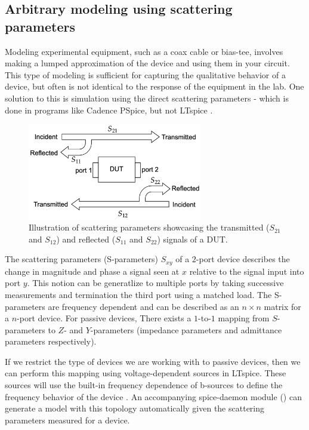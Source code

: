 \subsection{Arbitrary modeling using scattering parameters}

Modeling experimental equipment, such as a coax cable or bias-tee, involves making a 
lumped approximation of the device and using them in your circuit. 
This type of modeling is sufficient for capturing the qualitative behavior of a device,
but often is not identical to the response of the equipment in the lab.
One solution to this is simulation using the direct scattering parameters - which is
done in programs like Cadence PSpice, but not LTspice \cite{hspice}.

\begin{figure}[h]
    \centering
    \includegraphics[width=3in]{figs/sxy_diagram.png}
    \caption{Illustration of scattering parameters showcasing the transmitted ($S_{21}$ and $S_{12}$) and reflected ($S_{11}$ and $S_{22}$) signals of a DUT.}
    \label{fig:sxy}
\end{figure}

The scattering parameters (S-parameters) $S_{xy}$ of a $2$-port device describes the
change in magnitude and phase a signal seen at $x$ relative to the signal 
input into port $y$. This notion can be generatlize to multiple ports
by taking successive measurements and termination the third port using a
matched load. The S-parameters are frequency dependent and can be described
as an $n\times n$ matrix for a $n$-port device. For passive devices, There exists a 
$1$-to-$1$ mapping from $S$-parameters to $Z$- and $Y$-parameters (impedance 
parameters and admittance parameters respectively).

If we restrict the type of devices we are working with to passive devices,
then we can perform this mapping using voltage-dependent sources in 
LTspice. These sources will use the built-in frequency dependence of b-sources to
define the frequency behavior of the device \cite{microsim}. An accompanying spice-daemon
module () can generate a model with this topology
automatically given the scattering parameters measured for a device.

